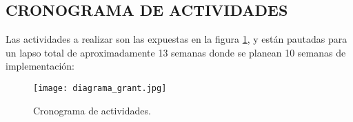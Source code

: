 
\subsection{CRONOGRAMA DE ACTIVIDADES}

    Las actividades a realizar son las expuestas en la figura
    \ref{cronograma2}, y están pautadas para un
    lapso total de aproximadamente 13 semanas donde se planean 10 semanas de
    implementación:

    \begin{figure}[htb]
		\centering
        \caption{Cronograma de actividades.}
		\texttt{[image: diagrama\_grant.jpg]}
		\label{cronograma2}
	\end{figure}

